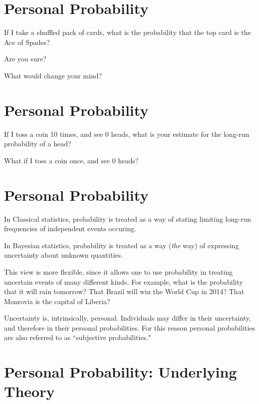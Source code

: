 
\section*{\hfil Personal Probability}

If I take a shuffled pack of cards, what is the probability
that the top card is the Ace of Spades? 

Are you sure?

What would change your mind?

\es\bs

\section*{\hfil Personal Probability}

If I toss a coin 10 times, and see 0 heads, what is your estimate
for the long-run probability of a head?

What if I toss a coin once, and see 0 heads?

\es\bs

\section*{\hfil Personal Probability}

In Classical statistics, probability is treated as a way of stating
limiting long-run frequencies of independent events occuring.

In Bayesian statistics, probability is treated as a way ({\it the} way)
of expressing uncertainty about unknown quantities.

This view is more flexible, since it allows one to use
probability in treating uncertain events of many different kinds.
For example, what is the probability 
that it will rain tomorrow? That Brazil will win the World Cup in 2014?
That Monrovia is the capital of Liberia?

Uncertainty is, intrinsically, personal. Individuals may differ in their uncertainty, and therefore
in their personal probabilities.   For this reason personal probabilities are also
referred to as ``subjective probabilities." 

\es\bs

\section*{Personal Probability: Underlying Theory}

